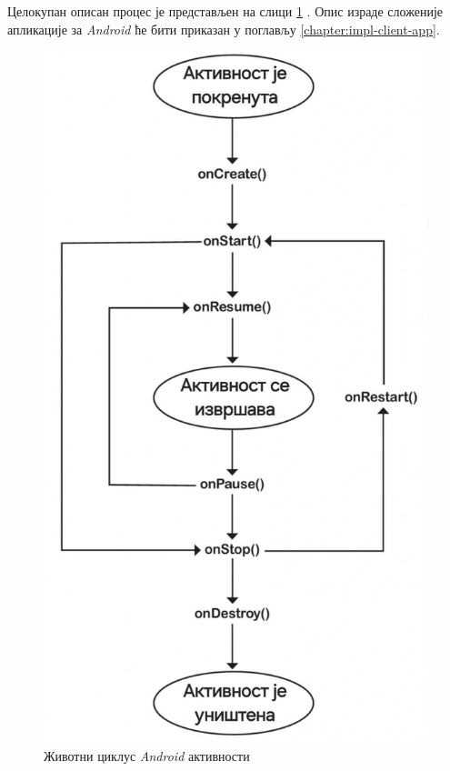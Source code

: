 \documentclass[12pt,oneside]{memoir}
\begin{document}
Целокупан описан процес је представљен на слици \ref{pic:android_activity_lifecycle} \cite{AndroidBezOklevanja}.
Опис израде сложеније апликације за \textit{Android} ће бити приказан у поглављу \ref{chapter:impl-client-app}.

\begin{figure}[h]
  \centering
  \includegraphics[scale=0.22]{assets/pictures/android_activity_lifecycle.jpg}
  \caption{Животни циклус \textit{Android} активности}
  \label{pic:android_activity_lifecycle}
\end{figure}
\end{document}
